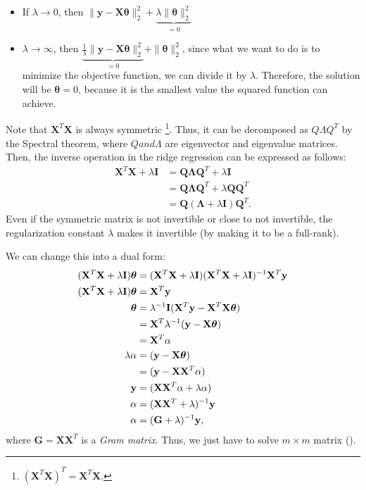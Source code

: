 \begin{itemize}
	\item If $\lambda\to 0$, then $\|\mathbf{y}-\mathbf{X}\boldsymbol{\theta}\|^2_2 + \underbrace{\lambda \|\boldsymbol{\theta}\|^2_2}_{=0}$ 
	\item $\lambda\to \infty$, then $\underbrace{\frac{1}{\lambda}\|\mathbf{y}-\mathbf{X}\boldsymbol{\theta}\|^2_2}_{=0} + \|\boldsymbol{\theta}\|^2_2$, since what we want to do is to minimize the objective function, we can divide it by $\lambda$. Therefore, the solution will be $\boldsymbol{\theta}=0$, because it is the smallest value the squared function can achieve. 
\end{itemize}
Note that $\mathbf{X}^T\mathbf{X}$ is always symmetric \footnote{$(\mathbf{X}^T\mathbf{X})^T = \mathbf{X}^T\mathbf{X}$.}. Thus, it can be decomposed as $Q\Lambda Q^T$ by the Spectral theorem, where $Q and \Lambda$ are eigenvector and eigenvalue matrices. Then, the inverse operation in the ridge regression can be expressed as follows:
\begin{align*}
	\mathbf{X}^T\mathbf{X}+\lambda\mathbf{I} &= \mathbf{Q}\mathbf{\Lambda}\mathbf{Q}^T+\lambda\mathbf{I}\\
											 &= \mathbf{Q}\mathbf{\Lambda}\mathbf{Q}^T+\lambda\mathbf{Q}\mathbf{Q}^T\\
											 &= \mathbf{Q}(\mathbf{\Lambda}+\lambda\mathbf{I})\mathbf{Q}^T.
\end{align*}
Even if the symmetric matrix is not invertible or close to not invertible, the regularization constant $\lambda$ makes it invertible (by making it to be a full-rank). 

We can change this into a dual form:
\begin{align}
	(\mathbf{X}^T\mathbf{X}+\lambda\mathbf{I})\boldsymbol{\theta}	&= (\mathbf{X}^T\mathbf{X}+\lambda\mathbf{I})(\mathbf{X}^T\mathbf{X}+\lambda\mathbf{I})^{-1}\mathbf{X}^T{\mathbf{y}}\\
	(\mathbf{X}^T\mathbf{X}+\lambda\mathbf{I})\boldsymbol{\theta} &= \mathbf{X}^T{\mathbf{y}}\\ 
	\boldsymbol{\theta} &= \lambda^{-1}\mathbf{I}(\mathbf{X}^T{\mathbf{y}}-\mathbf{X}^T\mathbf{X}\boldsymbol{\theta})\\
	&= \mathbf{X}^T\lambda^{-1}({\mathbf{y}}-\mathbf{X}\boldsymbol{\theta})\\
	&= \mathbf{X}^T\alpha\\
	\lambda\alpha &= ({\mathbf{y}}-\mathbf{X}\boldsymbol{\theta})\\
	&= ({\mathbf{y}}-\mathbf{X}\mathbf{X}^T\alpha)\\
	{\mathbf{y}} &= (\mathbf{X}\mathbf{X}^T\alpha+\lambda\alpha)\\
	\alpha &= (\mathbf{X}\mathbf{X}^T+\lambda)^{-1}{\mathbf{y}}\\
	\alpha &= (\mathbf{G}+\lambda)^{-1}{\mathbf{y}},
	\label{eq:dual_regression}
\end{align}
where $\mathbf{G} = \mathbf{X}\mathbf{X}^T$ is a \textit{Gram matrix}. Thus, we just have to solve $m\times m$ matrix (\cf {}).  




